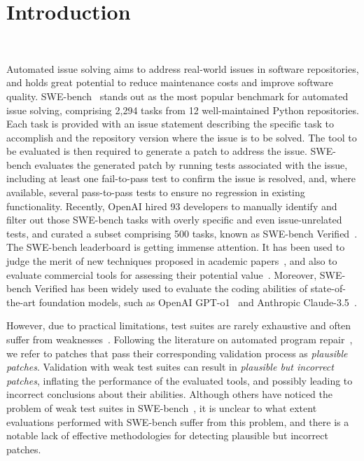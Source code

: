 \section{Introduction}~\label{sec:intro}

Automated issue solving aims to address real-world issues in software repositories, and holds great potential to reduce maintenance costs and improve software quality.
SWE-bench~\cite{jimenez2023swe} stands out as the most popular benchmark for automated issue solving, comprising 2,294 tasks from 12 well-maintained Python repositories.
Each task is provided with an issue statement describing the specific task to accomplish and the repository version where the issue is to be solved.
The tool to be evaluated is then required to generate a patch to address the issue. 
SWE-bench evaluates the generated patch by running tests associated with the issue, including at least one fail-to-pass test to confirm the issue is resolved, and, where available, several pass-to-pass tests to ensure no regression in existing functionality.
Recently, OpenAI hired 93 developers to manually identify and filter out those SWE-bench tasks with overly specific and even issue-unrelated tests, and curated a subset comprising 500 tasks, known as SWE-bench Verified~\cite{swebenchverified}.
The SWE-bench leaderboard is getting immense attention.
It has been used to judge the merit of new techniques proposed in academic papers~\cite{zhang2024autocoderover,xia2024agentless}, and also to evaluate commercial tools for assessing their potential value~\cite{wandbai, isoformai, blackboxai}.
Moreover, SWE-bench Verified has been widely used to evaluate the coding abilities of state-of-the-art foundation models, such as OpenAI GPT-o1~\cite{gpt-o1} and Anthropic Claude-3.5~\cite{claude-3.5}.




However, due to practical limitations, test suites are rarely exhaustive and often suffer from weaknesses~\cite{smith2015cure}.
Following the literature on automated program repair~\cite{liu2019tbar}, we refer to patches that pass their corresponding validation process as \emph{plausible patches}.
Validation with weak test suites can result in \emph{plausible but incorrect patches}, inflating the performance of the evaluated tools, and possibly leading to incorrect conclusions about their abilities.
Although others have noticed the problem of weak test suites in SWE-bench~\cite{swebenchverified, aleithan2024swe}, it is unclear to what extent evaluations performed with SWE-bench suffer from this problem, and there is a notable lack of effective methodologies for detecting plausible but incorrect patches.

